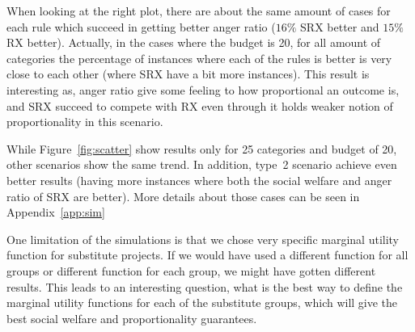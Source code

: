\documentclass[runningheads]{llncs}
\begin{document}
When looking at the right plot, there are about the same amount of cases for each rule which succeed in getting better anger ratio ($16\%$ SRX better and $15\%$ RX better). Actually, in the cases where the budget is 20, for all amount of categories the percentage of instances where each of the rules is better is very close to each other (where SRX have a bit more instances). This result is interesting as, anger ratio give some feeling to how proportional an outcome is, and SRX succeed to compete with RX even through it holds weaker notion of proportionality in this scenario.

While Figure~\ref{fig:scatter} show results only for 25 categories and budget of 20, other scenarios show the same trend. In addition, type~2 scenario achieve even better results (having more instances where both the social welfare and anger ratio of SRX are better). More details about those cases can be seen in Appendix~\ref{app:sim}







 
 One limitation of the simulations is that we chose very specific marginal utility function for substitute projects. If we would have used a different function for all groups or different function for each group, we might have gotten different results. This leads to an interesting question, what is the best way to define the marginal utility functions for each of the substitute groups, which will give the best social welfare and proportionality guarantees.
\end{document}
